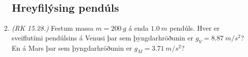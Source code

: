 \begin{enumerate}[label = \textbf{Dæmi \thechapter.\arabic*.}]

\newpage

\subsection*{Hreyfilýsing pendúls}

\item \textit{(RK 15.28.)} Festum massa $m = \SI{200}{g}$ á enda $\SI{1.0}{m}$ pendúls. Hver er sveiflutími pendúlsins á Venusi þar sem þyngdarhröðunin er $g_V = \SI{8.87}{m/s^2}$? En á Mars þar sem þyngdarhröðunin er $g_M = \SI{3.71}{m/s^2}$?


\end{enumerate}

